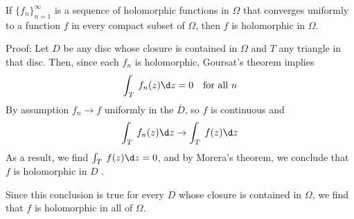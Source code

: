 \documentclass[12pt, oneside]{book}
\begin{document}
\begin{theorem}[Weierstrass's]
    If $\{f_n\}_{n=1}^\infty$ is a sequence of holomorphic functions in $\Omega$ that converges uniformly to a function $f$ in every compact subset of $\Omega$, then $f$ is holomorphic in $\Omega$.

    Proof: Let $D$ be any disc whose closure is contained in $\Omega$ and $T$ any triangle in that disc. Then, since each $f_n$ is holomorphic, Goursat's theorem implies
    $$\int_T\:f_n(z)\d z=0\quad \text{for all } n$$
    By assumption $f_n\to f$ uniformly in the $\overline{D}$, so $f$ is continuous and
    $$\int_T\:f_n(z)\d z\to\int_T\:f(z)\d z$$
    As a result, we find $\int_T\:f(z)\d z=0$, and by Morera's theorem, we conclude that $f$ is holomorphic in $D$ .

    Since this conclusion is true for every $D$ whose closure is contained in $\Omega$, we find that $f$ is holomorphic in all of $\Omega$.
\end{theorem}
\end{document}
